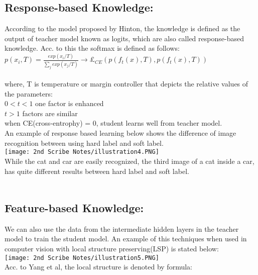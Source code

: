 \documentclass[12pt]{article}
\begin{document}
    \subsection{Response-based Knowledge:}
    
    According to the model proposed by Hinton, the knowledge is defined as the output of teacher model known as logits, which are also called response-based knowledge. Acc. to this the softmax is defined as follows: \\
    
    $p(x_i,T) = \frac{exp(x_i/T)}{\sum_j exp(x_j/T)} \rightarrow \pounds_{CE}(p(f_t(x),T),p(f_t(x),T))$ \\
    \\
    where, T is temperature or margin controller that depicts the relative values of the parameters:
    \\
    $0<t<1$ one factor is enhanced \\
    $t>1$ factors are similar \\
    when CE(cross-entrophy) = 0, student learns well from teacher model.\\
    
    An example of response based learning below shows the difference of image recognition between using hard label and soft label.\\
    
    \texttt{[image: 2nd Scribe Notes/illustration4.PNG]} \\
    
    While the cat and car are easily recognized, the third image of a cat inside a car, has quite different results between hard label and soft label.\\
    \\
    \subsection{Feature-based Knowledge:} 
    
    We can also use the data from the intermediate hidden layers in the teacher model to train the student model. An example of this techniques when used in computer vision with local structure preserving(LSP) is stated below:
    \\
    \texttt{[image: 2nd Scribe Notes/illustration5.PNG]}
    \\    
    Acc. to Yang et al, the local structure is denoted by formula:\\
    
\end{document}
